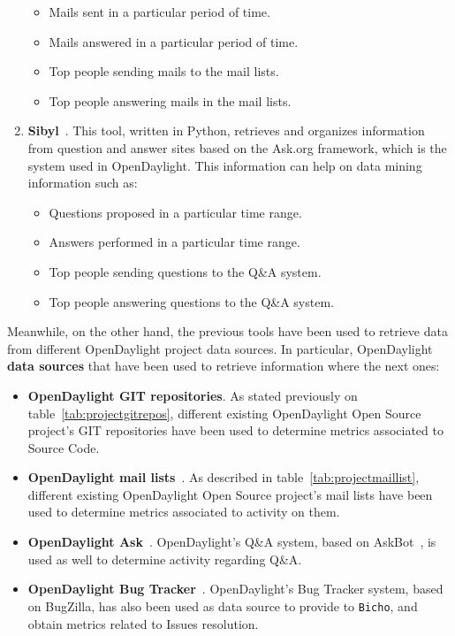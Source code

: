 \documentclass[a4paper, 12pt]{book}
\begin{document}
\begin{enumerate}
\begin{itemize}\itemsep0pt
\item{Mails sent in a particular period of time}.
\item{Mails answered in a particular period of time}.
\item{Top people sending mails to the mail lists}.
\item{Top people answering mails in the mail lists}.
\end{itemize}
\item{\textbf{Sibyl}~\cite{Sibyl}}. This tool, written in Python, retrieves and organizes information from question and answer sites based on the Ask.org framework, which is the system used in OpenDaylight. This information can help on data mining information such as:
\begin{itemize}\itemsep0pt
\item{Questions proposed in a particular time range}.
\item{Answers performed in a particular time range}.
\item{Top people sending questions to the Q\&A system}.
\item{Top people answering questions to the Q\&A system}.
\end{itemize}
\end{enumerate}
Meanwhile, on the other hand, the previous tools have been used to retrieve data from different OpenDaylight project data sources. In particular, OpenDaylight \textbf{data sources} that have been used to retrieve information where the next ones:
\begin{itemize}\itemsep0pt
\item{\textbf{OpenDaylight GIT repositories}}. As stated previously on table~\ref{tab:projectgitrepos}, different existing OpenDaylight Open Source project's GIT repositories have been used to determine metrics associated to Source Code.
\item{\textbf{OpenDaylight mail lists}}~\cite{OpenDaylightMailLists}. As described in table~\ref{tab:projectmaillist}, different existing OpenDaylight Open Source project's mail lists have been used to determine metrics associated to activity on them.
\item{\textbf{OpenDaylight Ask}~\cite{OpenDaylightAsk}}. OpenDaylight's Q\&A system, based on AskBot~\cite{AskBot}, is used as well to determine activity regarding Q\&A.
\item{\textbf{OpenDaylight Bug Tracker}~\cite{OpenDaylightBugzilla}}. OpenDaylight's Bug Tracker system, based on BugZilla, has also been used as data source to provide to \texttt{Bicho}, and obtain metrics related to Issues resolution.
\end{itemize}
\end{document}
